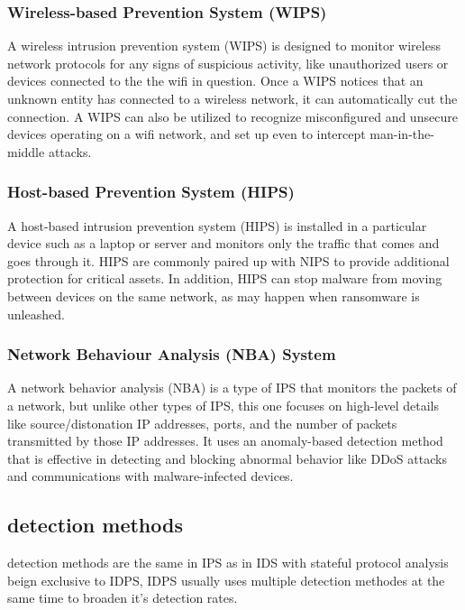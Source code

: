 \subsubsection{Wireless-based Prevention System (WIPS)}
A wireless intrusion prevention system (WIPS) is designed to monitor wireless network protocols for any signs of suspicious activity, like unauthorized users or devices connected to the the wifi in question. Once a WIPS notices that an unknown entity has connected to a wireless network, it can automatically cut the connection. A WIPS can also be utilized to recognize misconfigured and unsecure devices operating on a wifi network, and set up even to intercept man-in-the-middle attacks.\cite{IBM-IPS}

\subsubsection{Host-based Prevention System (HIPS)}
A host-based intrusion prevention system (HIPS) is installed in a particular device such as a laptop or server and monitors only the traffic that comes and goes through it. HIPS are commonly paired up with NIPS to provide additional protection for critical assets. In addition, HIPS can stop malware from moving between devices on the same network, as may happen when ransomware is unleashed.\cite{IBM-IPS}

\subsubsection{Network Behaviour Analysis (NBA) System}
A network behavior analysis (NBA) is a type of IPS that monitors the packets of a network, but unlike other types of IPS, this one focuses on high-level details like source/distonation IP addresses, ports, and the number of packets transmitted by those IP addresses. It uses an anomaly-based detection method that is effective in detecting and blocking abnormal behavior like DDoS attacks and communications with malware-infected devices.\cite{IBM-IPS}


\subsection{detection methods}

detection methods are the same in IPS as in IDS with stateful protocol analysis beign exclusive to IDPS, IDPS usually uses multiple detection methodes at the same time to broaden it's detection rates. \cite{NIST-IDPS}

